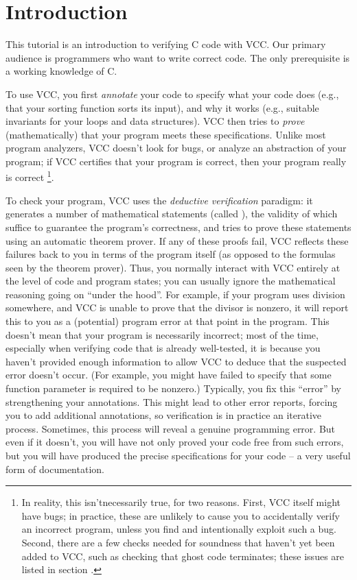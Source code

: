 \section{Introduction}
This tutorial is an introduction to verifying C code with VCC. Our
primary audience is programmers who want to write correct code.
The only prerequisite is a working knowledge of C.

To use VCC, you first \emph{annotate} your code to specify 
what your code does (e.g., that your sorting function sorts its input),
and why it works (e.g., suitable invariants for your loops and 
data structures).
VCC then tries to \emph{prove} (mathematically) that
your program meets these specifications.  Unlike most program
analyzers, VCC doesn't look for bugs, or analyze an abstraction of
your program; if VCC certifies that your program is correct, then your
program really is correct%
\footnote{
  In reality, this isn'tnecessarily true, for two reasons. 
  First, VCC itself might have bugs; in practice, these are unlikely to cause you to accidentally verify an
  incorrect program, unless you find and intentionally exploit such a
  bug. Second, there are a few checks needed for soundness that haven't yet
  been added to VCC, such as checking that ghost code terminates;
  these issues are listed in section .
  }. 

To check your program, VCC uses the \emph{deductive verification} paradigm:
it generates a number of mathematical
statements (called ), the validity of
which suffice to guarantee the program's correctness, and tries to
prove these statements using an automatic theorem prover. If any of
these proofs fail, VCC reflects these failures back to you in terms of
the program itself (as opposed to the formulas seen by the theorem
prover). Thus, you normally interact with VCC entirely at the level of
code and program states; you can usually ignore the mathematical
reasoning going on ``under the hood''.
For example, if your program uses division
somewhere, and VCC is unable to prove that the divisor is nonzero, it
will report this to you as a (potential) program error at that point in the
program. This doesn't mean that your program is necessarily incorrect;
most of the time, especially when verifying code that is already well-tested,
it is because you haven't provided enough information to allow VCC
to deduce that the suspected error doesn't occur.
(For example, you might have failed to specify that some function
parameter is required to be nonzero.)
Typically, you fix this ``error'' by strengthening your
annotations. This might lead to other error reports, forcing you to 
add additional annotations, so verification is in
practice an iterative process.  
Sometimes, this process will reveal a genuine programming error.
But even if it doesn't, you will have not only proved your code free from 
such errors, but you will have produced the precise specifications for your
code -- a very useful form of documentation.

